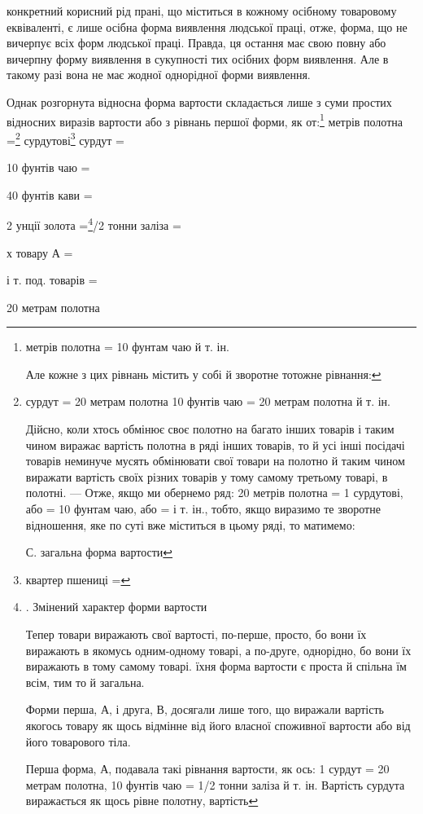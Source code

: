 \parcont{}  %
конкретний корисний рід прані, що міститься в кожному осібному
товаровому еквіваленті, є лише осібна форма виявлення людської
праці, отже, форма, що не вичерпує всіх форм людської праці.
Правда, ця остання має свою повну або вичерпну форму виявлення
в сукупності тих осібних форм виявлення. Але в такому разі вона
не має жодної однорідної форми виявлення.

Однак розгорнута відносна форма вартости складається лише
з суми простих відносних виразів вартости або з рівнань першої
форми, як от:\footnote{
метрів полотна = 10 фунтам чаю й т. ін.

Але кожне з цих рівнань містить у собі й зворотне тотожне
рівнання:
} метрів полотна =\footnote{
сурдут = 20 метрам полотна
10 фунтів чаю = 20 метрам полотна й т. ін.

Дійсно, коли хтось обмінює своє полотно на багато інших товарів
і таким чином виражає вартість полотна в ряді інших товарів,
то й усі інші посідачі товарів неминуче мусять обмінювати
свої товари на полотно й таким чином виражати вартість своїх
різних товарів у тому самому третьому товарі, в полотні. — Отже,
якщо ми обернемо ряд: 20 метрів полотна = 1 сурдутові, або =
10 фунтам чаю, або = і т. ін., тобто, якщо виразимо те зворотне
відношення, яке по суті вже міститься в цьому ряді, то матимемо:

С. загальна форма вартости
} сурдутові\footnote{
квартер пшениці =
} сурдут =

10 фунтів чаю =

40 фунтів кави =

2    унції золота =\footnote{
. Змінений характер форми вартости

Тепер товари виражають свої вартості, по-перше, просто, бо
вони їх виражають в якомусь одним-одному товарі, а по-друге,
однорідно, бо вони їх виражають в тому самому товарі. їхня форма
вартости є проста й спільна їм всім, тим то й загальна.

Форми перша, А, і друга, В, досягали лише того, що виражали
вартість якогось товару як щось відмінне від його власної
споживної вартости або від його товарового тіла.

Перша форма, А, подавала такі рівнання вартости, як ось: 1 сурдут
= 20 метрам полотна, 10 фунтів чаю = 1/2 тонни заліза й т. ін.
Вартість сурдута виражається як щось рівне полотну, вартість
}/2 тонни заліза =

х товару А =

і т. под. товарів =

20 метрам полотна
\parbreak{}  %
